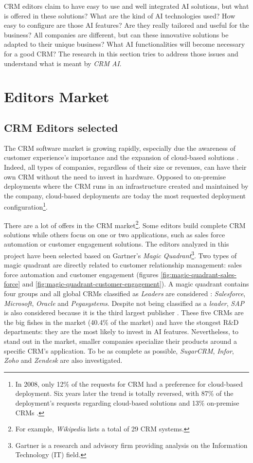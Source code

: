 CRM editors claim to have easy to use and well integrated AI solutions, but what is offered in these solutions? What are the kind of AI technologies used? How easy to configure are those AI features? Are they really tailored and useful for the business? All companies are different, but can these innovative solutions be adapted to their unique business? What AI functionalities will become necessary for a good CRM? The research in this section tries to address those issues and understand what is meant by \textit{CRM AI}.


\section{Editors Market} \label{sec:editors-market}


\subsection{CRM Editors selected}
The CRM software market is growing rapidly, especially due the awareness of customer experience's importance and the expansion of cloud-based solutions \cite{crm-revenue}. Indeed, all types of companies, regardless of their size or revenues, can have their own CRM without the need to invest in hardware. Opposed to on-premise deployments where the CRM runs in an infrastructure created and maintained by the company, cloud-based deployments are today the most requested deployment configuration\footnote{In 2008, only 12\% of the requests for CRM had a preference for cloud-based deployment. Six years later the trend is totally reversed, with 87\% of the deployment's requests regarding cloud-based solutions and 13\% on-premise CRMs \cite{crm-deployment-stats}.}.

There are a lot of offers in the CRM market\footnote{For example, \textit{Wikipedia} lists a total of 29 CRM systems.}. Some editors build complete CRM solutions while others focus on one or two applications, such as sales force automation or customer engagement solutions. The editors analyzed in this project have been selected based on Gartner's \textit{Magic Quadrant}\footnote{Gartner is a research and advisory firm providing analysis on the Information Technology (IT) field.}. Two types of magic quadrant are directly related to customer relationship management: sales force automation and customer engagement (figures \ref{fig:magic-quadrant-sales-force} and \ref{fig:magic-quadrant-customer-engagement}). A magic quadrant contains four groups and all global CRMs classified as \textit{Leaders} are considered : \textit{Salesforce}, \textit{Microsoft}, \textit{Oracle} and \textit{Pegasystems}. Despite not being classified as a \textit{leader}, \textit{SAP} is also considered because it is the third largest publisher \cite{crm-market-share}. These five CRMs are the big fishes in the market (40.4\% of the market) and have the stongest R\&D departments: they are the most likely to invest in AI features. Nevertheless, to stand out in the market, smaller companies specialize their products around a specific CRM's application. To be as complete as possible, \textit{SugarCRM}, \textit{Infor}, \textit{Zoho} and \textit{Zendesk} are also investigated.


